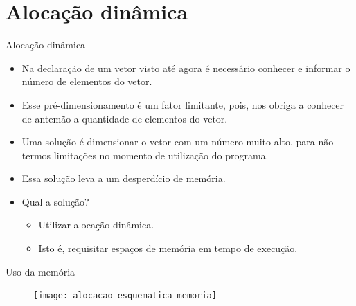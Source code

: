 \section{Alocação dinâmica}
\begin{frame}[c]{Alocação dinâmica}
  \begin{itemize}[<+->]
    \item Na declaração de um vetor visto até agora é necessário conhecer e informar o número de elementos do vetor.
    \item Esse pré-dimensionamento é um fator limitante, pois, nos obriga a conhecer de antemão a quantidade de elementos do vetor.
    \item Uma solução é dimensionar o vetor com um número muito alto, para não termos limitações no momento de utilização do programa.
    \item Essa solução leva a um desperdício de memória.
    \item Qual a solução?   
    \begin{itemize}[<+->]
      \item Utilizar alocação dinâmica.
      \item Isto é, requisitar espaços de memória em tempo de execução.
    \end{itemize}
  \end{itemize}
\end{frame}

\begin{frame}[plain,c]{Uso da memória}  
  \begin{figure}[ht]
      \centering
      \texttt{[image: alocacao\_esquematica\_memoria]}
  \end{figure}
\end{frame}

